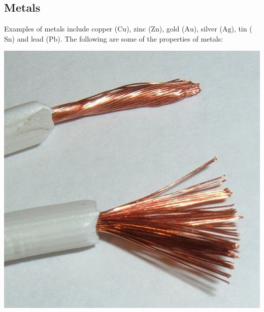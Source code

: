             \subsection*{Metals}
            \nopagebreak
\begin{minipage}{.5\textwidth}
        \label{m38708*id65726}Examples of metals include copper ($\text{Cu}$), zinc ($\text{Zn}$), gold ($\text{Au}$), silver ($\text{Ag}$), tin ($\text{Sn}$) and lead ($\text{Pb}$). The following are some of the properties of metals:\par 
\end{minipage}
\begin{minipage}{.5\textwidth}
\begin{center}
 \includegraphics[width=.2\textwidth]{photos/copperwire.jpg}
\end{center}
\end{minipage}

